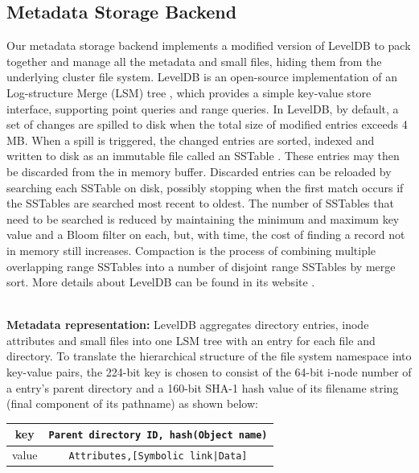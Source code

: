 \subsection{Metadata Storage Backend}
\label{design.leveldb}

Our metadata storage backend implements a modified version of LevelDB
\cite{leveldb} to pack together and manage all the metadata and small files,
hiding them from the underlying cluster file system.
LevelDB is an open-source implementation of an Log-structure Merge (LSM) tree \cite{ONeil1996},
which provides a simple key-value store interface,
supporting point queries and range queries. In LevelDB, by default,
a set of changes are spilled to disk when the total size of modified
entries exceeds 4 MB.  When a spill is triggered,
the changed entries are sorted, indexed and written to disk
as an immutable file called an SSTable \cite{BigTable}.
These entries may then be discarded from the in memory buffer.
Discarded entries can be reloaded by searching each SSTable on disk,
possibly stopping when the first match occurs if the SSTables are
searched most recent to oldest.  The number of SSTables that need to be
searched is reduced by maintaining the minimum and maximum key value
and a Bloom filter\cite{bloomfilter} on each,
but, with time, the cost of finding a record not in memory still increases.
Compaction is the process of combining multiple overlapping range SSTables
into a number of disjoint range SSTables by merge sort.
More details about LevelDB can be found in its website \cite{leveldb}.

~\\
\textbf{Metadata representation: }
LevelDB aggregates directory entries,
inode attributes and small files into one LSM tree
with an entry for each file and directory.
To translate the hierarchical structure of the file system namespace
into key-value pairs, the 224-bit key is chosen to consist of
the 64-bit i-node number of a entry's parent directory
and a 160-bit SHA-1 hash value of its filename string
(final component of its pathname) as shown below:

\begin{table}[!htc]
\center
\vspace{10pt}
\begin{tabular}{c|c}
key & \texttt{Parent directory ID, hash(Object name)} \\
\midrule
value & \texttt{Attributes,[Symbolic link|Data]} \\
\end{tabular}
\label{tab:keyschema}
\end{table}

